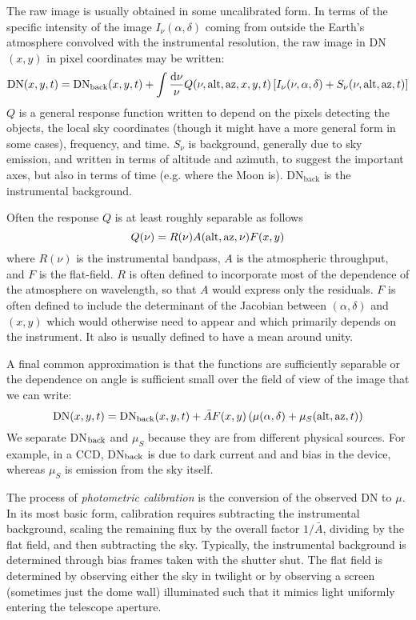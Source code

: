 The raw image is usually obtained in some uncalibrated form. In terms
of the specific intensity of the image $I_\nu(\alpha, \delta)$ coming
from outside the Earth's atmosphere convolved with the instrumental
resolution, the raw image in DN$(x,y)$ in pixel coordinates may be
written:
\begin{equation}
\mathrm{DN}(x, y, t) = \mathrm{DN}_{\mathrm{back}}(x, y, t) + 
\int \frac{{\rm d}\nu}{\nu} Q(\nu, {\rm alt}, {\rm az}, x, y, t)
\left[I_\nu(\nu, \alpha, \delta) + S_{\nu}(\nu, {\rm alt}, {\rm az},
t)\right]
\end{equation}
$Q$ is a general response function written to depend on the pixels
detecting the objects, the local sky coordinates (though it might have
a more general form in some cases), frequency, and time. $S_{\nu}$ is
background, generally due to sky emission, and written in terms of
altitude and azimuth, to suggest the important axes, but also in terms
of time (e.g. where the Moon is). DN$_{\mathrm{back}}$ is the
instrumental background.

Often the response $Q$ is at least roughly separable as follows
\begin{equation}
Q(\nu) = R(\nu) A({\rm alt}, {\rm az}, \nu) F(x, y)
\end{equation}
where $R(\nu)$ is the instrumental bandpass, $A$ is the atmospheric
throughput, and $F$ is the flat-field. $R$ is often defined to
incorporate most of the dependence of the atmosphere on wavelength, so
that $A$ would express only the residuals. $F$ is often defined to
include the determinant of the Jacobian between $(\alpha, \delta)$ and
$(x, y)$ which would otherwise need to appear and which primarily
depends on the instrument. It also is usually defined to have a mean
around unity.

A final common approximation is that the functions are sufficiently
separable or the dependence on angle is sufficient small over the
field of view of the image that we can write:
\begin{equation}
\mathrm{DN}(x, y, t) = \mathrm{DN}_{\mathrm{back}}(x, y, t) + 
\bar{A} F(x, y) \left(\mu(\alpha, \delta) + \mu_S({\rm alt}, {\rm az},
t)\right)
\end{equation}
We separate DN$_{\rm back}$ and $\mu_S$ because they are from
different physical sources. For example, in a CCD, DN$_{\rm back}$ is
due to dark current and and bias in the device, whereas $\mu_S$ is
emission from the sky itself.

The process of {\it photometric calibration} is the conversion of the
observed DN to $\mu$. In its most basic form, calibration requires
subtracting the instrumental background, scaling the remaining flux by
the overall factor $1/\bar{A}$, dividing by the flat field, and then
subtracting the sky. Typically, the instrumental background is
determined through bias frames taken with the shutter shut.  The flat
field is determined by observing either the sky in twilight or by
observing a screen (sometimes just the dome wall) illuminated such
that it mimics light uniformly entering the telescope aperture.

